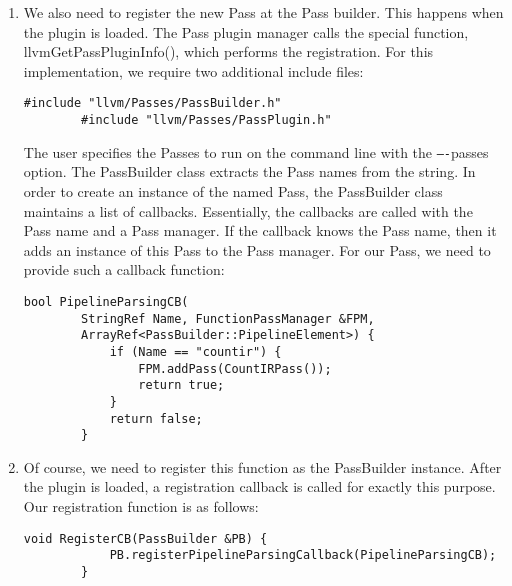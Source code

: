 \begin{enumerate}
	\item We also need to register the new Pass at the Pass builder. This happens when the plugin is loaded. The Pass plugin manager calls the special function, llvmGetPassPluginInfo(), which performs the registration. For this implementation, we require two additional include files:
	\begin{lstlisting}[caption={}]
		#include "llvm/Passes/PassBuilder.h"
		#include "llvm/Passes/PassPlugin.h"
	\end{lstlisting}
	The user specifies the Passes to run on the command line with the \verb|–-|passes option. The PassBuilder class extracts the Pass names from the string. In order to create an instance of the named Pass, the PassBuilder class maintains a list of callbacks. Essentially, the callbacks are called with the Pass name and a Pass manager. If the callback knows the Pass name, then it adds an instance of this Pass to the Pass manager. For our Pass, we need to provide such a callback function:
	\begin{lstlisting}[caption={}]
		bool PipelineParsingCB(
		StringRef Name, FunctionPassManager &FPM,
		ArrayRef<PassBuilder::PipelineElement>) {
			if (Name == "countir") {
				FPM.addPass(CountIRPass());
				return true;
			}
			return false;
		}
	\end{lstlisting}
	
	\item Of course, we need to register this function as the PassBuilder instance. After the plugin is loaded, a registration callback is called for exactly this purpose. Our registration function is as follows:
	\begin{lstlisting}[caption={}]
		void RegisterCB(PassBuilder &PB) {
			PB.registerPipelineParsingCallback(PipelineParsingCB);
		}
	\end{lstlisting}
	

\end{enumerate}

